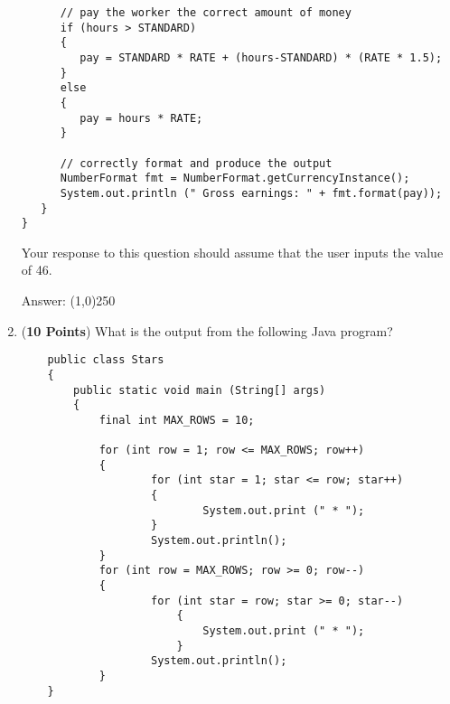 \documentclass[12pt]{article}
\begin{document}
\begin{enumerate}
\begin{minipage}{6in}
\begin{lstlisting}
      // pay the worker the correct amount of money
      if (hours > STANDARD) 
      {
         pay = STANDARD * RATE + (hours-STANDARD) * (RATE * 1.5);
      }
      else 
      {
         pay = hours * RATE;
      }

      // correctly format and produce the output
      NumberFormat fmt = NumberFormat.getCurrencyInstance();
      System.out.println (" Gross earnings: " + fmt.format(pay));
   }
}
  \end{lstlisting}

\end{minipage}

Your response to this question should assume that the user inputs the value of 46.

Answer: \line(1,0){250}

\item ({\bf 10 Points}) What is the output from the following Java program?

\hspace*{.25in}
\begin{minipage}{6in}
  \lstset{numbers=left}
  \begin{lstlisting}
    public class Stars
    {
     	public static void main (String[] args)
        {
            final int MAX_ROWS = 10;

            for (int row = 1; row <= MAX_ROWS; row++)
            {
                    for (int star = 1; star <= row; star++)
                    {
                            System.out.print (" * ");
                    }
                    System.out.println();
            }
            for (int row = MAX_ROWS; row >= 0; row--)
            {
                    for (int star = row; star >= 0; star--)
                        {
                            System.out.print (" * ");
                        }
                    System.out.println();
            }
    }
  \end{lstlisting}

\end{minipage}


\end{enumerate}
\end{document}
